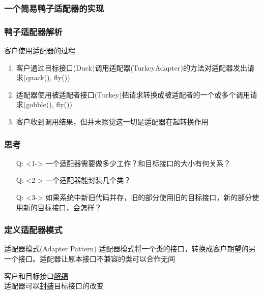 \documentclass[compress]{beamer}
\begin{document}
{\begin{frame}
  \frametitle{一个简易鸭子适配器的实现}
   {
    \vspace*{1ex}
    \verbduck
  }
   {
    \vspace*{1ex}
    \verbturkey
  }
   {
    \vspace*{1ex}
    \verbadapter
  }
   {
    \vspace*{1ex}
    \verbtest
  }
   {
    \vspace*{1ex}
    \verboutput
  }
\end{frame}
}

\begin{frame}
\frametitle{鸭子适配器解析}
客户使用适配器的过程
\begin{enumerate}
\item 客户通过目标接口(Duck)调用适配器(TurkeyAdapter)的方法对适配器发出请求(quack(), fly())
\item 适配器使用被适配者接口(Turkey)把请求转换成被适配者的一个或多个调用请求(gobble(), fly())
\item 客户收到调用结果，但并未察觉这一切是适配器在起转换作用
\end{enumerate}
\end{frame}

\begin{frame}
\frametitle{思考}
\begin{itemize}
\item [Q:] <1-> 一个适配器需要做多少工作？和目标接口的大小有何关系？
\item [Q:] <2-> 一个适配器能封装几个类？
\item [Q:] <3-> 如果系统中新旧代码并存，旧的部分使用旧的目标接口，新的部分使用新的目标接口，会怎样？
\end{itemize}
\end{frame}

\begin{frame}
\frametitle{定义适配器模式}
 {
\begin{block}{适配器模式(Adapter Pattern) }
适配器模式将一个类的接口，转换成客户期望的另一个接口。适配器让原本接口不兼容的类可以合作无间
\end{block}
\vspace*{2ex}
客户和目标接口\uline{解耦}\\
适配器可以\uline{封装}目标接口的改变 \\

}

 {
}

\end{frame}
\end{document}
